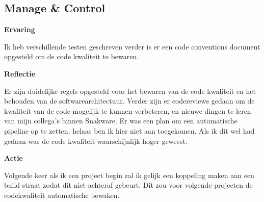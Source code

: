 \subsection{Manage \& Control}
\textbf{Ervaring}

\whitespace
Ik heb verschillende testen geschreven verder is er een code conventions document opgesteld om de code kwaliteit te bewaren.

\whitespace
\textbf{Reflectie}

\whitespace
Er zijn duidelijke regels opgesteld voor het bewaren van de code kwaliteit en het behouden van de softwarearchitectuur.
Verder zijn er codereviews gedaan om de kwaliteit van de code mogelijk te kunnen verbeteren, en nieuwe dingen te leren van mijn collega's binnen Snakware.
Er was een plan om een automatische pipeline op te zetten, helaas ben ik hier niet aan toegekomen.
Als ik dit wel had gedaan was de code kwaliteit waarschijnlijk hoger geweest. 

\whitespace
\textbf{Actie}

\whitespace
Volgende keer als ik een project begin zal ik gelijk een koppeling maken aan een build straat zodat dit niet achteraf gebeurt.
Dit zou voor volgende projecten de codekwaliteit automatische bewaken.
